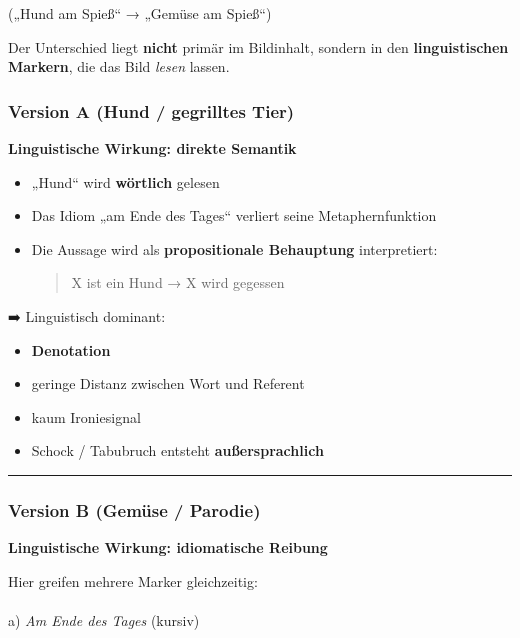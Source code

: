 \documentclass[
  letterpaper,
  DIV=11,
  numbers=noendperiod]{scrartcl}
\makeatletter
\let\oldparagraph\paragraph
\renewcommand{\paragraph}{
    \@ifstar
      \xxxParagraphStar
      \xxxParagraphNoStar
  }
\newcommand{\xxxParagraphStar}[1]{\oldparagraph*{#1}\mbox{}}
\newcommand{\xxxParagraphNoStar}[1]{\oldparagraph{#1}\mbox{}}
\providecommand{\tightlist}{%
  \setlength{\itemsep}{0pt}\setlength{\parskip}{0pt}}
\makeatother
\begin{document}
(„Hund am Spieß`` → „Gemüse am Spieß``)

Der Unterschied liegt \textbf{nicht} primär im Bildinhalt, sondern in
den \textbf{linguistischen Markern}, die das Bild \emph{lesen} lassen.

\subsubsection{Version A (Hund / gegrilltes
Tier)}\label{version-a-hund-gegrilltes-tier}

\textbf{Linguistische Wirkung: direkte Semantik}

\begin{itemize}
\item
  „Hund`` wird \textbf{wörtlich} gelesen
\item
  Das Idiom „am Ende des Tages`` verliert seine Metaphernfunktion
\item
  Die Aussage wird als \textbf{propositionale Behauptung} interpretiert:

  \begin{quote}
  X ist ein Hund → X wird gegessen
  \end{quote}
\end{itemize}

➡️ Linguistisch dominant:

\begin{itemize}
\tightlist
\item
  \textbf{Denotation}
\item
  geringe Distanz zwischen Wort und Referent
\item
  kaum Ironiesignal
\item
  Schock / Tabubruch entsteht \textbf{außersprachlich}
\end{itemize}

\begin{center}\rule{0.5\linewidth}{0.5pt}\end{center}

\subsubsection{Version B (Gemüse /
Parodie)}\label{version-b-gemuxfcse-parodie}

\textbf{Linguistische Wirkung: idiomatische Reibung}

Hier greifen mehrere Marker gleichzeitig:

\paragraph{\texorpdfstring{a) \emph{Am Ende des Tages}
(kursiv)}{a) Am Ende des Tages (kursiv)}}\label{a-am-ende-des-tages-kursiv}
\end{document}
